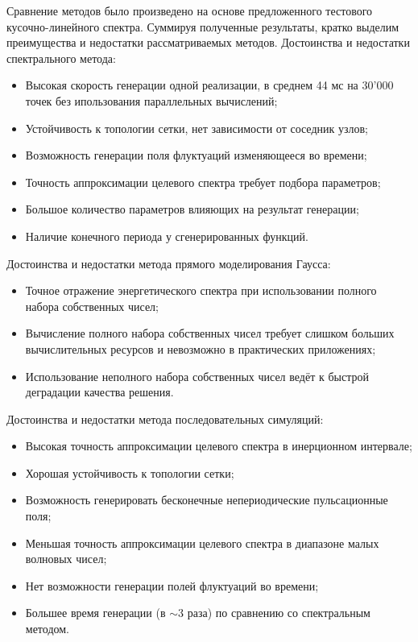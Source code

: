 Сравнение методов было произведено на основе предложенного тестового кусочно-линейного спектра.
Суммируя полученные результаты, кратко выделим преимущества и недостатки рассматриваемых методов.
\newline
Достоинства и недостатки спектрального метода:
\begin{itemize}[label=+]
    \item Высокая скорость генерации одной реализации, в среднем 44 мс на 30'000 точек без ипользования параллельных вычислений;
    \item Устойчивость к топологии сетки, нет зависимости от соседник узлов;
    \item Возможность генерации поля флуктуаций изменяющееся во времени;
\end{itemize}
\begin{itemize}[label=--]
    \item Точность аппроксимации целевого спектра требует подбора параметров;
    \item Большое количество параметров влияющих на результат генерации;
    \item Наличие конечного периода у сгенерированных функций.
\end{itemize}
Достоинства и недостатки метода прямого моделирования Гаусса:
\begin{itemize}[label=+]
    \item Точное отражение энергетического спектра при использовании полного набора собственных чисел;
\end{itemize}
\begin{itemize}[label=--]
    \item Вычисление полного набора собственных чисел требует слишком больших вычислительных ресурсов и невозможно в практических приложениях;
    \item Использование неполного набора собственных чисел ведёт к быстрой деградации качества решения.
\end{itemize}
Достоинства и недостатки метода последовательных симуляций:
\begin{itemize}[label=+]
    \item Высокая точность аппроксимации целевого спектра в инерционном интервале;
    \item Хорошая устойчивость к топологии сетки;
    \item Возможность генерировать бесконечные непериодические пульсационные поля;
\end{itemize}
\begin{itemize}[label=--]
    \item Меньшая точность аппроксимации целевого спектра в диапазоне малых волновых чисел;
    \item Нет возможности генерации полей флуктуаций во времени;
    \item Большее время генерации (в $\sim$3 раза) по сравнению со спектральным методом.
\end{itemize}

